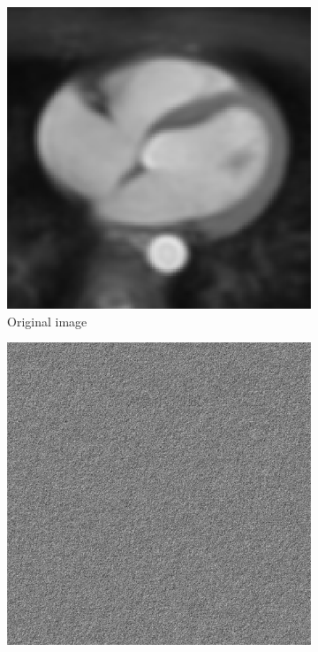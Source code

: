 \documentclass[UTF8]{ctexart}
\begin{document}
\begin{figure}[htbp]
    \centering
    \begin{subfigure}{0.3\textwidth}
        \centering
        \includegraphics[width=\linewidth]{heartimg.png}
        \caption{Original image}
    \end{subfigure}%
    \hfill
    \begin{subfigure}{0.3\textwidth}
        \centering
        \includegraphics[width=\linewidth]{white_noise2.png}

\end{subfigure}
\end{figure}
\end{document}
